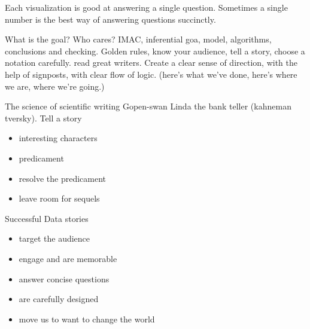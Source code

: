 Each visualization is good at answering a
single question. Sometimes a single number is the
best way of answering questions succinctly.

What is the goal? Who cares?
IMAC, inferential goa, model, algorithms, conclusions and checking.
Golden rules, know your audience, tell a story, choose a notation
carefully. read great writers. Create a clear sense of direction,
with the help of signposts, with clear flow of logic.
(here's what we've done, here's where we are, where we're going.)

The science of scientific writing Gopen-swan
Linda the bank teller (kahneman tversky).
Tell a story
\begin{itemize}
\item interesting characters
\item predicament
\item resolve the predicament
\item leave room for sequels
\end{itemize}

Successful Data stories
\begin{itemize}
\item target the audience
\item engage and are memorable
\item answer concise questions
\item are carefully designed
\item move us to want to change the world
\end{itemize}



